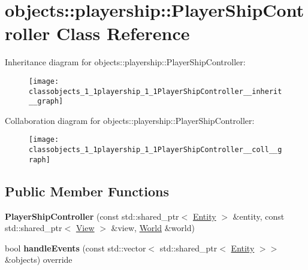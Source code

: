 \hypertarget{classobjects_1_1playership_1_1PlayerShipController}{}\section{objects\+:\+:playership\+:\+:Player\+Ship\+Controller Class Reference}
\label{classobjects_1_1playership_1_1PlayerShipController}


Inheritance diagram for objects\+:\+:playership\+:\+:Player\+Ship\+Controller\+:\nopagebreak
\begin{figure}[H]
\begin{center}
\leavevmode
\texttt{[image: classobjects\_1\_1playership\_1\_1PlayerShipController\_\_inherit\_\_graph]}
\end{center}
\end{figure}


Collaboration diagram for objects\+:\+:playership\+:\+:Player\+Ship\+Controller\+:\nopagebreak
\begin{figure}[H]
\begin{center}
\leavevmode
\texttt{[image: classobjects\_1\_1playership\_1\_1PlayerShipController\_\_coll\_\_graph]}
\end{center}
\end{figure}
\subsection*{Public Member Functions}
\begin{DoxyCompactItemize}
\item 
\mbox{\label{classobjects_1_1playership_1_1PlayerShipController_a5f57a0601302205580b099c4037ab2d7}}
{\bfseries Player\+Ship\+Controller} (const std\+::shared\+\_\+ptr$<$ \hyperlink{classobjects_1_1Entity}{Entity} $>$ \&entity, const std\+::shared\+\_\+ptr$<$ \hyperlink{classobjects_1_1View}{View} $>$ \&view, \hyperlink{classWorld}{World} \&world)
\item 
\mbox{\label{classobjects_1_1playership_1_1PlayerShipController_ad3af27cacdd1e761b9ae2fab78814325}}
bool {\bfseries handle\+Events} (const std\+::vector$<$ std\+::shared\+\_\+ptr$<$ \hyperlink{classobjects_1_1Entity}{Entity} $>$$>$ \&objects) override
\end{DoxyCompactItemize}
